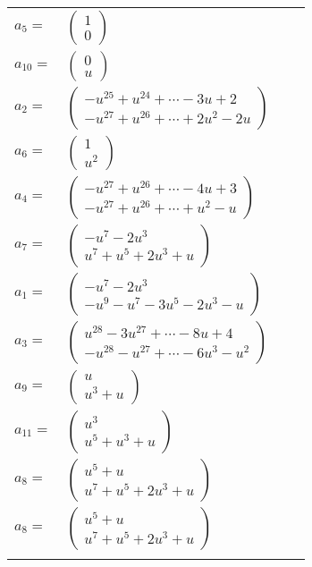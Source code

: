 \documentclass[1p]{elsarticle_modified}
\theoremstyle{definition}
\begin{document}
\begin{tabular}{m{7pt} m{180pt} m{7pt} m{180pt} }
\flushright $a_{5}=$&$\begin{pmatrix}1\\0\end{pmatrix}$ \\
\flushright $a_{10}=$&$\begin{pmatrix}0\\u\end{pmatrix}$ \\
\flushright $a_{2}=$&$\begin{pmatrix}- u^{25}+u^{24}+\cdots-3 u+2\\- u^{27}+u^{26}+\cdots+2 u^2-2 u\end{pmatrix}$ \\
\flushright $a_{6}=$&$\begin{pmatrix}1\\u^2\end{pmatrix}$ \\
\flushright $a_{4}=$&$\begin{pmatrix}- u^{27}+u^{26}+\cdots-4 u+3\\- u^{27}+u^{26}+\cdots+u^2- u\end{pmatrix}$ \\
\flushright $a_{7}=$&$\begin{pmatrix}- u^7-2 u^3\\u^7+u^5+2 u^3+u\end{pmatrix}$ \\
\flushright $a_{1}=$&$\begin{pmatrix}- u^7-2 u^3\\- u^9- u^7-3 u^5-2 u^3- u\end{pmatrix}$ \\
\flushright $a_{3}=$&$\begin{pmatrix}u^{28}-3 u^{27}+\cdots-8 u+4\\- u^{28}- u^{27}+\cdots-6 u^3- u^2\end{pmatrix}$ \\
\flushright $a_{9}=$&$\begin{pmatrix}u\\u^3+u\end{pmatrix}$ \\
\flushright $a_{11}=$&$\begin{pmatrix}u^3\\u^5+u^3+u\end{pmatrix}$ \\
\flushright $a_{8}=$&$\begin{pmatrix}u^5+u\\u^7+u^5+2 u^3+u\end{pmatrix}$\\ \flushright $a_{8}=$&$\begin{pmatrix}u^5+u\\u^7+u^5+2 u^3+u\end{pmatrix}$\\&\end{tabular}
\end{document}
